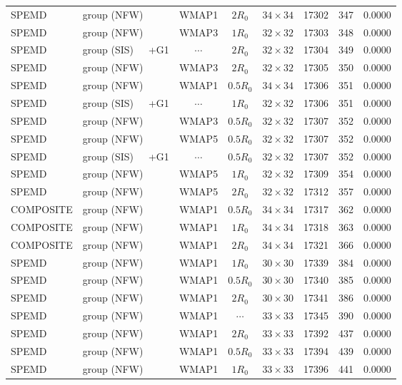 \documentclass[useAMS,usenatbib]{mnras}
\def\nomicro{$\cdots$}
\def\nodata{$\cdots$}
\begin{document}
\begin{table}
\begin{tabular}{llccccrr}
        SPEMD     & group (NFW)       &WMAP1 & $2R_{0}$&$34\times34$ & 17302 & 347 & 0.0000\\
        SPEMD     & group (NFW)       &WMAP3 & $1R_{0}$&$32\times32$ & 17303 & 348 & 0.0000\\
        SPEMD     & group (SIS)~~~+G1 &\nodata& $2R_{0}$&$32\times32$ & 17304 & 349 & 0.0000\\
        SPEMD     & group (NFW)       &WMAP3 & $2R_{0}$&$32\times32$ & 17305 & 350 & 0.0000\\
        SPEMD     & group (NFW)       &WMAP1 & $0.5R_{0}$&$34\times34$ & 17306 & 351 & 0.0000\\
        SPEMD     & group (SIS)~~~+G1 &\nodata& $1R_{0}$&$32\times32$ & 17306 & 351 & 0.0000\\
        SPEMD     & group (NFW)       &WMAP3 & $0.5R_{0}$&$32\times32$ & 17307 & 352 & 0.0000\\
        SPEMD     & group (NFW)       &WMAP5 & $0.5R_{0}$&$32\times32$ & 17307 & 352 & 0.0000\\
        SPEMD     & group (SIS)~~~+G1 &\nodata & $0.5R_{0}$&$32\times32$ & 17307 & 352 & 0.0000\\
        SPEMD     & group (NFW)       &WMAP5 & $1R_{0}$&$32\times32$ & 17309 & 354 & 0.0000\\
        SPEMD     & group (NFW)       &WMAP5 & $2R_{0}$&$32\times32$ & 17312 & 357 & 0.0000\\
        COMPOSITE & group (NFW)       &WMAP1 & $0.5R_{0}$&$34\times34$ & 17317 & 362 & 0.0000\\
        COMPOSITE & group (NFW)       &WMAP1 & $1R_{0}$&$34\times34$ & 17318 & 363 & 0.0000\\
        COMPOSITE & group (NFW)       &WMAP1 & $2R_{0}$&$34\times34$ & 17321 & 366 & 0.0000\\
        SPEMD     & group (NFW)       &WMAP1 & $1R_{0}$&$30\times30$ & 17339 & 384 & 0.0000\\
        SPEMD     & group (NFW)       &WMAP1 & $0.5R_{0}$&$30\times30$ & 17340 & 385 & 0.0000\\
        SPEMD     & group (NFW)       &WMAP1 & $2R_{0}$&$30\times30$ & 17341 & 386 & 0.0000\\
        SPEMD     & group (NFW)       &WMAP1 & \nomicro&$33\times33$ & 17345 & 390 & 0.0000\\
        SPEMD     & group (NFW)       &WMAP1 & $2R_{0}$&$33\times33$ & 17392 & 437 & 0.0000\\
        SPEMD     & group (NFW)       &WMAP1 & $0.5R_{0}$&$33\times33$ & 17394 & 439 & 0.0000\\
        SPEMD     & group (NFW)       &WMAP1 & $1R_{0}$&$33\times33$ & 17396 & 441 & 0.0000\\
        \hline
    \end{tabular}
\end{table}


\bsp	%
\label{lastpage}
\end{document}
